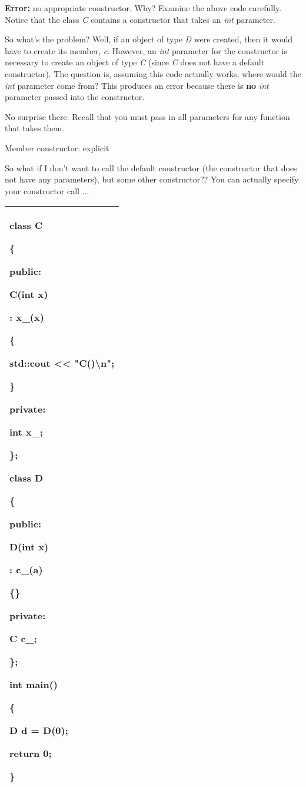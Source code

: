 \documentclass[
]{article}
\begin{document}
\textbf{Error:} no appropriate constructor. Why? Examine the above code
carefully. Notice that the class \emph{C} contains a constructor that
takes an \emph{int} parameter.

So what's the problem? Well, if an object of type \emph{D} were created,
then it would have to create its member, \emph{c}. However, an
\emph{int} parameter for the constructor is necessary to create an
object of type \emph{C} (since \emph{C} does not have a default
constructor). The question is, assuming this code actually works, where
would the \emph{int} parameter come from? This produces an error because
there is \textbf{no} \emph{int} parameter passed into the constructor.

No surprise there. Recall that you must pass in all parameters for any
function that takes them.

Member constructor: explicit

So what if I don't want to call the default constructor (the constructor
that does not have any parameters), but some other constructor?? You can
actually specify your constructor call ...

\begin{longtable}[]{@{}l@{}}
\toprule
\endhead
\begin{minipage}[t]{0.97\columnwidth}\raggedright
class C

\{

public:

C(int x)

: x\_(x)

\{

std::cout \textless\textless{} "C()\textbackslash n";

\}

private:

int x\_;

\};

class D

\{

public:

D(int x)

: \textbf{c\_(a)}

\{\}

private:

C c\_;

\};

int main()

\{

D d = D(0);

return 0;

\}\strut
\end{minipage}\tabularnewline
\bottomrule
\end{longtable}
\end{document}
